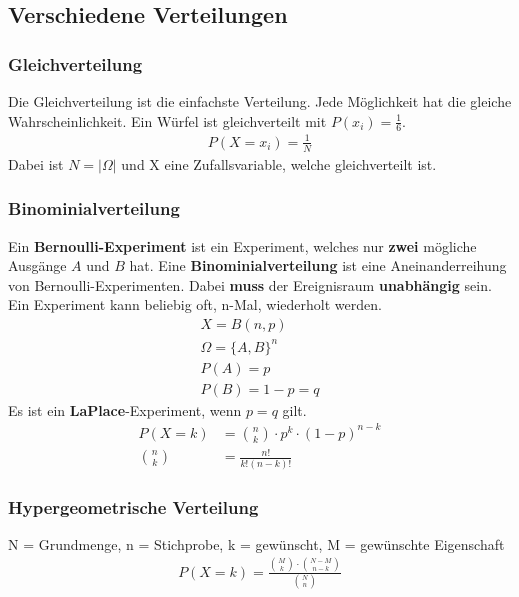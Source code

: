 \documentclass[a4paper, landscape, 10pt]{article}
\begin{document}
\begin{multicols}{5}
\begin{small}
	    \subsection{Verschiedene Verteilungen}
		   \subsubsection{Gleichverteilung}	
			   Die Gleichverteilung ist die einfachste Verteilung. Jede Möglichkeit hat die gleiche Wahrscheinlichkeit. Ein Würfel ist gleichverteilt mit $P(x_i) = \frac{1}{6}$.\\
			   \begin{align*}
			   P(X = x_i) = \frac{1}{N}
			   \end{align*}
			   Dabei ist $N = |\Omega|$ und X eine Zufallsvariable, welche gleichverteilt ist.
	    	\subsubsection{Binominialverteilung}
			    Ein \textbf{Bernoulli-Experiment} ist ein Experiment, welches nur \textbf{zwei} mögliche Ausgänge $A$ und $B$ hat. Eine \textbf{Binominialverteilung} ist eine Aneinanderreihung von Bernoulli-Experimenten. Dabei \textbf{muss} der Ereignisraum \textbf{unabhängig} sein. Ein Experiment kann beliebig oft, n-Mal, wiederholt werden.
				    \begin{align*}
				    X = B(n, p)\\
				    \Omega = \{A, B\}^n\\
				    P(A) = p\\
				    P(B) = 1 - p = q
				    \end{align*}
	    		Es ist ein \textbf{LaPlace}-Experiment, wenn $p = q$ gilt.
			    \begin{align*}
			    P(X = k) &= {n \choose k} \cdot p^k \cdot (1-p)^{n-k}\\
			    {n \choose k} &= \frac{n!}{k! (n-k)!}
			    \end{align*}
			
			\subsubsection{Hypergeometrische Verteilung}
			N = Grundmenge, n = Stichprobe, k = gewünscht, M = gewünschte Eigenschaft\\
			\begin{align*}
			P(X = k) = \frac{{M \choose k} \cdot {N - M \choose n - k}}{{N \choose n}}
			\end{align*}

\end{small}
\end{multicols}
\end{document}
